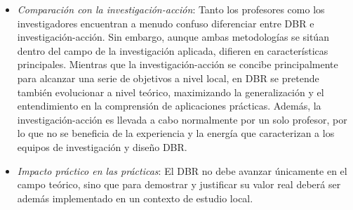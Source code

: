 \begin{itemize}
\item \emph{Comparación con la investigación-acción}: Tanto los profesores como los investigadores encuentran a menudo confuso diferenciar entre DBR e investigación-acción. Sin embargo, aunque ambas metodologías se sitúan dentro del campo de la investigación aplicada, difieren en características principales. Mientras que la investigación-acción se concibe principalmente para alcanzar una serie de objetivos a nivel local, en DBR se pretende también evolucionar a nivel teórico, maximizando la generalización y el entendimiento en la comprensión de aplicaciones prácticas. Además, la investigación-acción es llevada a cabo normalmente por un solo profesor, por lo que no se beneficia de la experiencia y la energía que caracterizan a los equipos de investigación y diseño DBR.
\item \emph{Impacto práctico en las prácticas}: El DBR no debe avanzar únicamente en el campo teórico, sino que para demostrar y justificar su valor real deberá ser además implementado en un contexto de estudio local.
\end{itemize}


